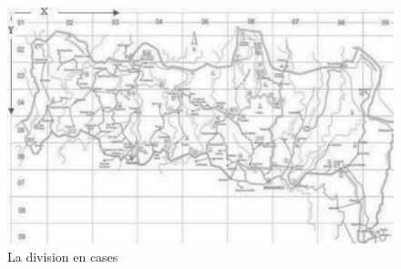 \documentclass{article}
\begin{document}
\begin{sffamily}
\begin{figure}[h!]
    \begin{center}
    \includegraphics[scale=0.7]{park.pdf}
    \caption{La division en cases}
    \label{park}
    \end{center}	
\end{figure}

\newpage


\end{sffamily}
\end{document}
